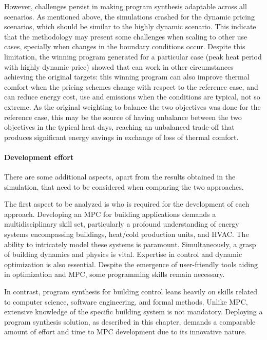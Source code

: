 However, challenges persist in making program synthesis adaptable across all scenarios. As mentioned above, the simulations crashed for the dynamic pricing scenarios, which should be similar to the highly dynamic scenario. This indicate that the methodology may present some challenges when scaling to other use cases, specially when changes in the boundary conditions occur. Despite this limitation, the winning program generated for a particular case (peak heat period with highly dynamic price) showed that can work in other circumstances achieving the original targets: this winning program can also improve thermal comfort when the pricing schemes change with respect to the reference case, and can reduce energy cost, use and emissions when the conditions are typical, not so extreme. As the original weighting to balance the two objectives was done for the reference case, this may be the source of having unbalance between the two objectives in the typical heat days, reaching an unbalanced trade-off that produces significant energy savings in exchange of loss of thermal comfort.

\paragraph{Development effort}
There are some additional aspects, apart from the results obtained in the simulation, that need to be considered when comparing the two approaches.

The first aspect to be analyzed is who is required for the development of each approach. 
Developing an MPC for building applications demands a multidisciplinary skill set, particularly a profound understanding of energy systems encompassing buildings, heat/cold production units, and HVAC. The ability to intricately model these systems is paramount. Simultaneously, a grasp of building dynamics and physics is vital. Expertise in control and dynamic optimization is also essential. Despite the emergence of user-friendly tools aiding in optimization and MPC, some programming skills remain necessary. 

In contrast, program synthesis for building control leans heavily on skills related to computer science, software engineering, and formal methods. Unlike MPC, extensive knowledge of the specific building system is not mandatory. Deploying a program synthesis solution, as described in this chapter, demands a comparable amount of effort and time to MPC development due to its innovative nature.

